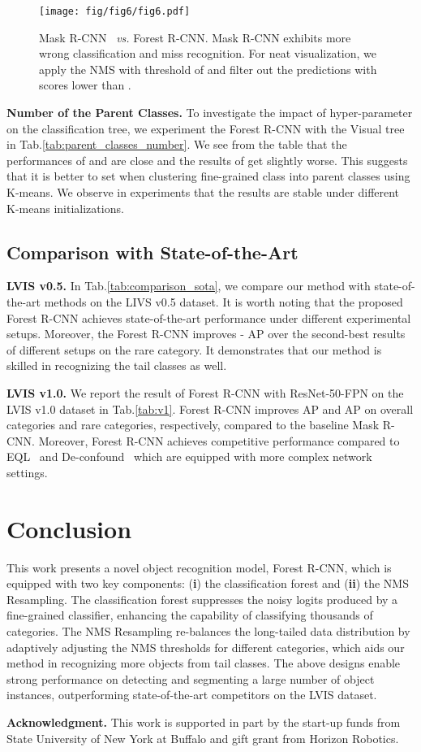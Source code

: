 \documentclass[sigconf]{acmart}
\newcommand{\myparagraph}[1]{{\vspace{0.5em} \noindent \bf #1}}
\begin{document}
\begin{figure*}
	\centering
	\texttt{[image: fig/fig6/fig6.pdf]}
	\vspace{-6mm}
	\caption{Mask R-CNN~\cite{maskrcnn} \emph{vs.} Forest R-CNN. Mask R-CNN exhibits more wrong classification and miss recognition. For neat visualization, we apply the NMS with threshold of  and filter out the predictions with scores lower than .}
	\label{fig:example}
\end{figure*}

\myparagraph{Number of the Parent Classes.} To investigate the impact of hyper-parameter  on the classification tree, we experiment the Forest R-CNN with the Visual tree in Tab.\ref{tab:parent_classes_number}. We see from the table that the performances of  and  are close and the results of  get slightly worse. This suggests that it is better to set  when clustering  fine-grained class into  parent classes using K-means. We observe in experiments that the results are stable under different K-means initializations.

\subsection{Comparison with State-of-the-Art}
\myparagraph{LVIS v0.5.} In Tab.\ref{tab:comparison_sota}, we compare our method with state-of-the-art methods on the LIVS v0.5 dataset. It is worth noting that the proposed Forest R-CNN achieves state-of-the-art performance under different experimental setups. Moreover, the Forest R-CNN improves - AP over the second-best results of different setups on the rare category. It demonstrates that our method is skilled in recognizing the tail classes as well.

\myparagraph{LVIS v1.0.} We report the result of Forest R-CNN with ResNet-50-FPN on the LVIS v1.0 dataset in Tab.\ref{tab:v1}. Forest R-CNN improves  AP and  AP on overall categories and rare categories, respectively, compared to the baseline Mask R-CNN. Moreover, Forest R-CNN achieves competitive performance compared to EQL~\cite{equalization_loss} and De-confound~\cite{tang2020long} which are equipped with more complex network settings.

\section{Conclusion}
This work presents a novel object recognition model, Forest R-CNN, which is equipped with two key components: (\textbf{i}) the classification forest and (\textbf{ii}) the NMS Resampling. The classification forest suppresses the noisy logits produced by a fine-grained classifier, enhancing the capability of classifying thousands of categories. The NMS Resampling re-balances the long-tailed data distribution by adaptively adjusting the NMS thresholds for different categories, which aids our method in recognizing more objects from tail classes. The above designs enable strong performance on detecting and segmenting a large number of object instances, outperforming state-of-the-art competitors on the LVIS dataset.

\myparagraph{Acknowledgment.} This work is supported in part by the start-up funds from State University of New York at Buffalo and gift grant from Horizon Robotics.



\end{document}

